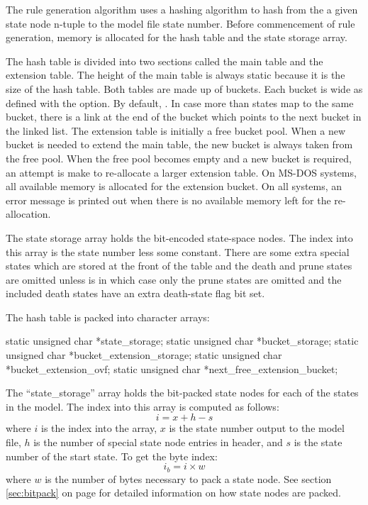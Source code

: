 The  rule generation algorithm uses a hashing algorithm
to hash from the a given state node n-tuple to the model file state number.
Before commencement of rule generation, memory is allocated for the hash
table and the state storage array.

The hash table is divided into two sections called the main table
and the extension table.   The height of the main table is always static
because it is the size of the hash table.
Both tables are made up of buckets.   Each bucket is  wide
as defined with the  option.   By default, .
In case more than  states map to the same bucket, there
is a link at the end of the bucket which points to the next bucket in the
linked list.   The extension table is initially a free bucket pool.   When
a new bucket is needed to extend the main table, the new bucket is always
taken from the free pool.   When the free pool becomes empty and a new
bucket is required, an attempt is make to re-allocate a larger extension
table.   On MS-DOS systems, all available memory is allocated for the extension
bucket.   On all systems, an error message is printed out when there is no
available memory left for the re-allocation.

The state storage array holds the bit-encoded state-space nodes.   The index
into this array is the state number less some constant.   There are some
extra special states which are stored at the front of the table and the
death and prune states are omitted unless  is  in
which case only the prune states are omitted and the included death states
have an extra death-state flag bit set.

The hash table is packed into character arrays:

\begin{codeexample}
static unsigned char *state_storage;
static unsigned char *bucket_storage;
static unsigned char *bucket_extension_storage;
static unsigned char *bucket_extension_ovf;
static unsigned char *next_free_extension_bucket;
\end{codeexample}


The ``state\_storage'' array holds the bit-packed state nodes for each of the
states in the model.   The index into this array is computed as follows:
\[ i = x + h - s \]
where $i$ is the index into the array, $x$ is the state number output to the
model file, $h$ is the number of special state node entries in header, and
$s$ is the state number of the start state.   To get the byte index:
\[ i_{b} = i \times w \]
where $w$ is the number of bytes necessary to pack a state node.
See section \ref{sec:bitpack} on page \pageref{sec:bitpack} for detailed
information on how state nodes are packed.

